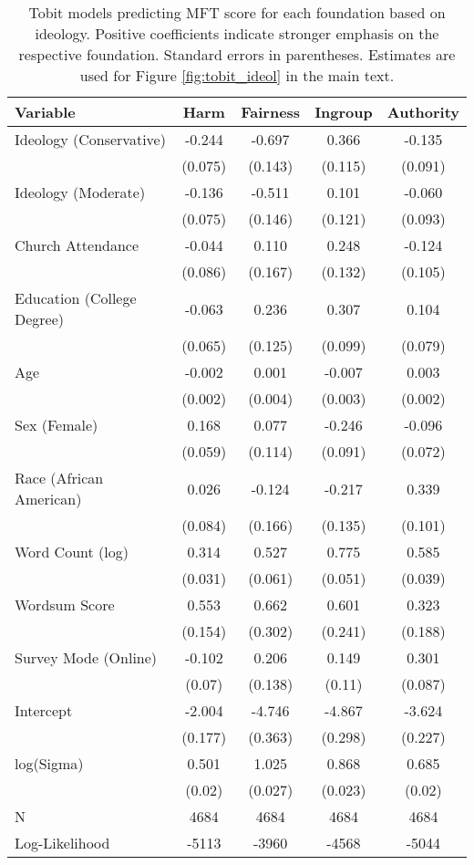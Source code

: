 \begin{table}[ht]
\centering
\caption{Tobit models predicting MFT score for each foundation based 
           on ideology. Positive coefficients indicate stronger emphasis on the respective 
           foundation. Standard errors in parentheses. Estimates are used for Figure 
           \ref{fig:tobit_ideol} in the main text.} 
\label{tab:tobit_ideol}
\begingroup\footnotesize
\begin{tabular}{lcccc}
  \hline
Variable & Harm & Fairness & Ingroup & Authority \\ 
  \hline
Ideology (Conservative) & -0.244 & -0.697 &  0.366 & -0.135 \\ 
   & (0.075) & (0.143) & (0.115) & (0.091) \\ 
  Ideology (Moderate) & -0.136 & -0.511 &  0.101 & -0.060 \\ 
   & (0.075) & (0.146) & (0.121) & (0.093) \\ 
  Church Attendance & -0.044 &  0.110 &  0.248 & -0.124 \\ 
   & (0.086) & (0.167) & (0.132) & (0.105) \\ 
  Education (College Degree) & -0.063 &  0.236 &  0.307 &  0.104 \\ 
   & (0.065) & (0.125) & (0.099) & (0.079) \\ 
  Age & -0.002 &  0.001 & -0.007 &  0.003 \\ 
   & (0.002) & (0.004) & (0.003) & (0.002) \\ 
  Sex (Female) &  0.168 &  0.077 & -0.246 & -0.096 \\ 
   & (0.059) & (0.114) & (0.091) & (0.072) \\ 
  Race (African American) &  0.026 & -0.124 & -0.217 &  0.339 \\ 
   & (0.084) & (0.166) & (0.135) & (0.101) \\ 
  Word Count (log) &  0.314 &  0.527 &  0.775 &  0.585 \\ 
   & (0.031) & (0.061) & (0.051) & (0.039) \\ 
  Wordsum Score &  0.553 &  0.662 &  0.601 &  0.323 \\ 
   & (0.154) & (0.302) & (0.241) & (0.188) \\ 
  Survey Mode (Online) & -0.102 &  0.206 &  0.149 &  0.301 \\ 
   & (0.07) & (0.138) & (0.11) & (0.087) \\ 
  Intercept & -2.004 & -4.746 & -4.867 & -3.624 \\ 
   & (0.177) & (0.363) & (0.298) & (0.227) \\ 
  log(Sigma) &  0.501 &  1.025 &  0.868 &  0.685 \\ 
   & (0.02) & (0.027) & (0.023) & (0.02) \\ 
   \hline
N & 4684 & 4684 & 4684 & 4684 \\ 
  Log-Likelihood & -5113 & -3960 & -4568 & -5044 \\ 
   \hline
\end{tabular}
\endgroup
\end{table}
